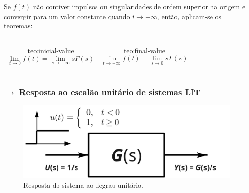 Se $f(t)$ não contiver impulsos ou singularidades de ordem superior na origem e convergir para um valor constante quando $t \to +\infty$, então, aplicam-se os teoremas:
\begin{center}%
    \begin{tabular}{c c}%
        \begin{minipage}{0.425\linewidth}%
            \begin{theo}[\underline{Teorema do Valor Incial}]{teo:inicial-value}\label{teo:inicial-value}
                $$
                    \lim_{t \to 0} f(t) = \lim_{s \to +\infty} sF(s)
                $$
            \end{theo}%
        \end{minipage}%
        &%
        \begin{minipage}{0.425\linewidth}%
            \begin{theo}[\underline{Teorema do Valor Final}]{teo:final-value}\label{teo:final-value}
                $$
                    \lim_{t \to +\infty} f(t) = \lim_{s \to 0} sF(s)
                $$
            \end{theo}%
        \end{minipage}%
    \end{tabular}%
\end{center}%

\subsubsection[2.1.2 Resposta ao escalão unitário de sistemas LIT]{$\pmb{\rightarrow}$ Resposta ao escalão unitário de sistemas LIT}

\begin{figure}[H]
    \centering
    \includegraphics[width = 0.5\linewidth]{img/2/unit-step-response.png}
    \caption{Resposta do sistema ao degrau unitário.}
    \label{fig:unit-step-response}
\end{figure}

